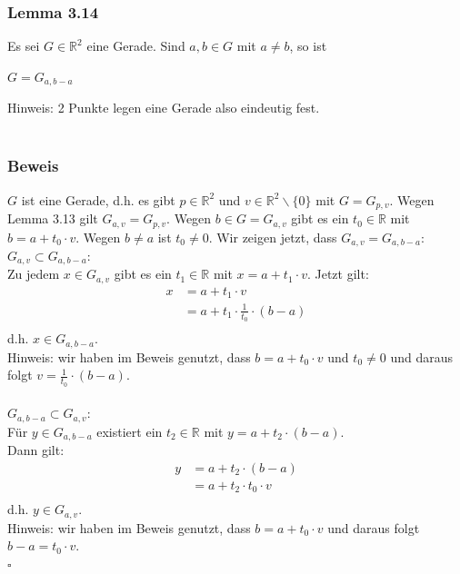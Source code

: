 \documentclass{article}
\begin{document}
\subsubsection*{Lemma 3.14}
Es sei $G \in \mathbb{R}^2$ eine Gerade. Sind $a,b \in G$ mit $a \neq b$, so ist \\
\begin{center}
    $G = G_{a,b-a}$  \\
\end{center}
Hinweis: 2 Punkte legen eine Gerade also eindeutig fest. \\
\\
\subsubsection*{Beweis}
$G$ ist eine Gerade, d.h. es gibt $p \in \mathbb{R}^2$ und $v \in \mathbb{R}^2\backslash\{0\}$ mit $G = G_{p,v}$. 
Wegen Lemma 3.13 gilt $G_{a,v} = G_{p,v}$. Wegen $b \in G = G_{a,v}$ gibt es ein $t_0 \in \mathbb{R}$ mit $b = a + t_0 \cdot v$. 
Wegen $b \neq a$ ist $t_0 \neq 0$. Wir zeigen jetzt, dass $G_{a,v} = G_{a,b-a}$: \\
\underline{\textit{$G_{a,v} \subset G_{a,b-a}$}}: \\
Zu jedem $x \in G_{a,v}$ gibt es ein $t_1 \in \mathbb{R}$ mit $x = a + t_1 \cdot v$.
Jetzt gilt: \\
\begin{align*}
    x &= a + t_1 \cdot v \\
    &= a + t_1 \cdot \frac{1}{t_0} \cdot (b-a) \\
\end{align*}
d.h. $x \in G_{a,b-a}$. \\
Hinweis: wir haben im Beweis genutzt, dass $b=a+t_0 \cdot v$ und $t_0 \neq 0$ und daraus folgt $v = \frac{1}{t_0} \cdot (b-a)$. \\
\\
\underline{\textit{$G_{a, b-a} \subset G_{a,v}$}}: \\
Für $y \in G_{a,b-a}$ existiert ein $t_2 \in \mathbb{R}$ mit $y = a + t_2 \cdot (b-a)$. \\
Dann gilt: \\
\begin{align*}
    y &= a + t_2 \cdot (b-a) \\
    &= a + t_2 \cdot t_0 \cdot v \\
\end{align*}
d.h. $y \in G_{a,v}$. \\
Hinweis: wir haben im Beweis genutzt, dass $b=a+t_0 \cdot v$ und daraus folgt $b-a = t_0 \cdot v$. \\
$\square$ \\
\\
\end{document}
